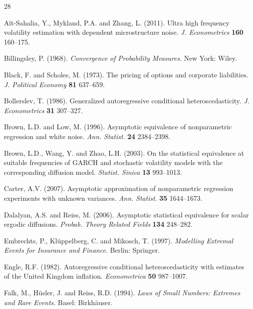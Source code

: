 \documentclass[number,citesort,seceqn,dvips]{arxbj}
\begin{document}
\begin{thebibliography}{28}

A{\"{i}}t-Sahalia, Y., Mykland, P.A. and Zhang, L. (2011).
Ultra high frequency volatility estimation with dependent
microstructure noise.
\textit{J. Econometrics} \textbf{160} 160--175.

Billingsley, P. (1968).\vadjust{\goodbreak} \textit{Convergence of Probability
Measures.} New York: Wiley.

Black, F. and Scholes, M. (1973). The pricing of options and
corporate liabilities. \textit{J. Political Economy} \textbf{81} 637--659.

Bollerslev, T. (1986). Generalized autoregressive
conditional heteroscedasticity. \textit{J. Econometrics} \textbf{31} 307--327.

Brown, L.D. and Low, M. (1996). Asymptotic equivalence of
nonparametric regression and white noise. \textit{Ann. Statist.}
\textbf{24} 2384--2398.

Brown, L.D., Wang, Y. and Zhao, L.H. (2003). On the
statistical equivalence at suitable frequencies of GARCH and
stochastic volatility models with the corresponding diffusion model.
\textit{Statist. Sinica} \textbf{13} 993--1013.

Carter, A.V. (2007). Asymptotic approximation of nonparametric
regression experiments with unknown variances.
\textit{Ann. Statist.} \textbf{35} 1644--1673.

Dalalyan, A.S. and Reiss, M. (2006). Asymptotic
statistical equivalence for scalar ergodic diffusions.
\textit{Probab. Theory Related Fields} \textbf{134} 248--282.

Embrechts, P., Kl{\"{u}}ppelberg, C. and Mikosch, T. (1997).
\textit{Modelling Extremal Events for Insurance and Finance.}
Berlin: Springer.

Engle, R.F. (1982). Autoregressive conditional
heteroscedasticity with estimates of the United Kingdom inflation.
\textit{Econometrica} \textbf{50} 987--1007.

Falk, M., H\"{u}sler, J. and Reiss, R.D. (1994).
\textit{Laws of Small Numbers: Extremes and Rare Events.}
Basel: Birkh\"{a}user.


\end{thebibliography}
\end{document}
